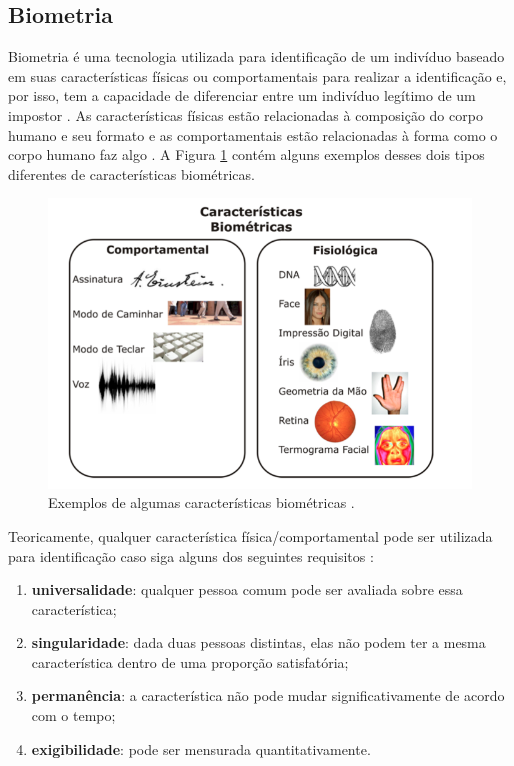 \subsection{Biometria}
\label{sec:biometria}
	Biometria é uma tecnologia utilizada para identificação de um indivíduo baseado
	em suas características físicas ou comportamentais para realizar a identificação
	e, por isso, tem a capacidade de diferenciar entre um indivíduo legítimo de um
	impostor \cite{hong}. As características físicas estão relacionadas à
	composição do corpo humano e seu formato e as comportamentais estão
	relacionadas à forma como o corpo humano faz algo \cite{drovetto}. A Figura
	\ref{caracteristicasBiometricas} contém alguns exemplos desses dois tipos
	diferentes de características biométricas.

	\begin{figure}[H]
		\begin{center}
			\includegraphics[scale=0.5]{figuras/2.FundamentacaoTeorica/caracteristicasBiometricas.png}
		\end{center}
		\caption{Exemplos de algumas características biométricas \cite{drovetto}.}
		\label{caracteristicasBiometricas}
	\end{figure}


	Teoricamente, qualquer característica física/comportamental pode ser utilizada
	para identificação caso siga alguns dos seguintes requisitos \cite{milene}:

	\begin{enumerate}
		\item \textbf{universalidade}: qualquer pessoa comum pode ser avaliada sobre essa característica;
		\item \textbf{singularidade}: dada duas pessoas distintas, elas não podem ter a mesma característica dentro de uma proporção satisfatória;
		\item \textbf{permanência}: a característica não pode mudar significativamente de acordo com o tempo;
		\item \textbf{exigibilidade}: pode ser mensurada quantitativamente.
	\end{enumerate}


